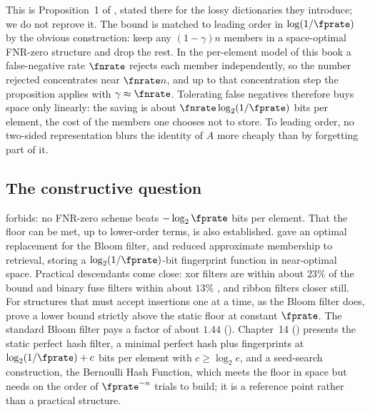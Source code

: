 This is Proposition~1 of \textcite{pagh-rodler-2001}, stated there for the
lossy dictionaries they introduce; we do not reprove it. The bound is matched
to leading order in $\log(1/\fprate)$ by the obvious construction: keep any
$(1 - \gamma)n$ members in a space-optimal FNR-zero structure and drop the
rest. In the per-element model of this book a false-negative rate $\fnrate$
rejects each member independently, so the number rejected concentrates near
$\fnrate n$, and up to that concentration step the proposition applies with
$\gamma \approx \fnrate$. Tolerating false negatives therefore buys space only
linearly: the saving is about $\fnrate \log_2(1/\fprate)$ bits per element,
the cost of the members one chooses not to store. To leading order, no
two-sided representation blurs the identity of $A$ more cheaply than by
forgetting part of it.

\subsection*{The constructive question}

 forbids: no FNR-zero scheme beats $-\log_2 \fprate$
bits per element. That the floor can be met, up to lower-order terms, is also
established. \textcite{pagh-pagh-rao-2005} gave an optimal replacement for the
Bloom filter, and \textcite{dietzfelbinger-pagh-2008} reduced approximate
membership to retrieval, storing a $\log_2(1/\fprate)$-bit
fingerprint function in near-optimal space. Practical descendants come
close: xor filters are within about $23\%$ of the bound and
binary fuse filters within about $13\%$
\parencite{graf-lemire-2020,graf-lemire-2022}, and ribbon
filters \parencite{dietzfelbinger-et-al-2026-ribbon}
closer still. For structures
that must accept insertions one at a time, as the Bloom filter does,
\textcite{lovett-porat-2010} prove a lower bound strictly above the static
floor at constant $\fprate$. The standard Bloom filter pays a factor of about
$1.44$ (). Chapter~14 ()
presents the static perfect hash filter, a minimal perfect hash plus
fingerprints at $\log_2(1/\fprate) + c$ bits per element with $c \ge \log_2
e$, and a seed-search construction, the Bernoulli Hash
Function, which meets the floor in space but
needs on the order of $\fprate^{-n}$ trials to build; it is a reference point
rather than a practical structure.

